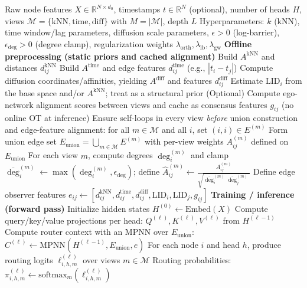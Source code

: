 \documentclass[11pt]{article}
\begin{document}
\begin{algorithm}[h]
\caption{THORN++: Transport-aligned Heterogeneous Observer-Routed Neighborhood Attention}
\label{alg:thornpp}
\begin{algorithmic}[1]
\Require Raw node features $X\in\mathbb{R}^{N\times d_0}$, timestamps $t\in\mathbb{R}^{N}$ (optional), number of heads $H$, views $\mathcal{M}=\{\text{kNN},\text{time},\text{diff}\}$ with $M=|\mathcal{M}|$, depth $L$
\Require Hyperparameters: $k$ (kNN), time window/lag parameters, diffusion scale parameters, $\epsilon>0$ (log-barrier), $\epsilon_{\deg}>0$ (degree clamp), regularization weights $\lambda_{\mathrm{orth}},\lambda_{\mathrm{lb}},\lambda_{\mathrm{gw}}$
\Statex
\State \textbf{Offline preprocessing (static priors and cached alignment)}
\State Build $A^{\text{kNN}}$ and distances $d^{\text{kNN}}_{ij}$
\State Build $A^{\text{time}}$ and edge features $d^{\text{time}}_{ij}$ (e.g., $|t_i-t_j|$)
\State Compute diffusion coordinates/affinities, yielding $A^{\text{diff}}$ and features $d^{\text{diff}}_{ij}$
\State Estimate $\mathrm{LID}_i$ from the base space and/or $A^{\text{kNN}}$; treat as a structural prior
\State (Optional) Compute ego-network alignment scores between views and cache as consensus features $g_{ij}$ (no online OT at inference)
\State Ensure self-loops in every view \emph{before} union construction and edge-feature alignment: for all $m\in\mathcal{M}$ and all $i$, set $(i,i)\in E^{(m)}$
\State Form union edge set $E_{\mathrm{union}}=\bigcup_{m\in\mathcal{M}}E^{(m)}$ with per-view weights $A^{(m)}_{ij}$ defined on $E_{\mathrm{union}}$
\State For each view $m$, compute degrees $\deg_i^{(m)}$ and clamp $\bar\deg_i^{(m)}\gets \max(\deg_i^{(m)},\epsilon_{\deg})$; define $\hat A_{ij}^{(m)}\gets \frac{A_{ij}^{(m)}}{\sqrt{\bar\deg_i^{(m)}\bar\deg_j^{(m)}}}$
\State Define edge observer features $e_{ij}\gets[d^{\text{kNN}}_{ij},d^{\text{time}}_{ij},d^{\text{diff}}_{ij},\mathrm{LID}_i,\mathrm{LID}_j,g_{ij}]$
\Statex
\State \textbf{Training / inference (forward pass)}
\State Initialize hidden states $H^{(0)}\gets \mathrm{Embed}(X)$
    \State Compute query/key/value projections per head: $Q^{(\ell)},K^{(\ell)},V^{(\ell)}$ from $H^{(\ell-1)}$
    \State Compute router context with an MPNN over $E_{\mathrm{union}}$: $C^{(\ell)}\gets \mathrm{MPNN}(H^{(\ell-1)},E_{\mathrm{union}},e)$
    \State For each node $i$ and head $h$, produce routing logits $\ell_{i,h,m}^{(\ell)}$ over views $m\in\mathcal{M}$
    \State Routing probabilities: $\pi_{i,h,m}^{(\ell)}\gets \mathrm{softmax}_{m}(\ell_{i,h,m}^{(\ell)})$

\end{algorithmic}
\end{algorithm}
\end{document}
